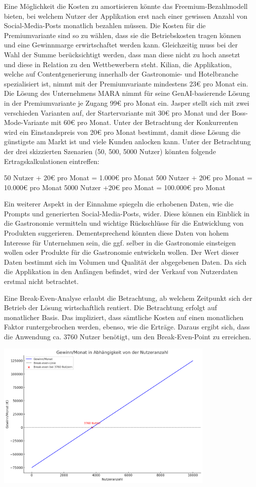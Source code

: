 Eine Möglichkeit die Kosten zu amortisieren könnte das Freemium-Bezahlmodell bieten, bei welchem Nutzer der Applikation erst nach einer gewissen Anzahl von Social-Media-Posts monatlich bezahlen müssen.
Die Kosten für die Premiumvariante sind so zu wählen, dass sie die Betriebskosten tragen können und eine Gewinnmarge erwirtschaftet werden kann.
Gleichzeitig muss bei der Wahl der Summe berücksichtigt werden, dass man diese nicht zu hoch ansetzt und diese in Relation zu den Wettbewerbern steht.
Kilian, die Applikation, welche auf Contentgenerierung innerhalb der Gastronomie- und Hotelbranche spezialisiert ist, nimmt mit der Premiumvariante mindestens 23€ pro Monat ein.
Die Lösung des Unternehmens MARA nimmt für seine GenAI-basierende Lösung in der Premiumvariante je Zugang 99€ pro Monat ein.
Jasper stellt sich mit zwei verschieden Varianten auf, der Startervariante mit 30€ pro Monat und der Boss-Mode-Variante mit 60€ pro Monat.
Unter der Betrachtung der Konkurrenten wird ein Einstandspreis von 20€ pro Monat bestimmt, damit diese Lösung die günstigste am Markt ist und viele Kunden anlocken kann.
Unter der Betrachtung der drei skizzierten Szenarien (50, 500, 5000 Nutzer) könnten folgende Ertragskalkulationen eintreffen:

50 Nutzer + 20€ pro Monat = 1.000€ pro Monat
500 Nutzer + 20€ pro Monat = 10.000€ pro Monat
5000 Nutzer +20€ pro Monat = 100.000€ pro Monat


Ein weiterer Aspekt in der Einnahme spiegeln die erhobenen Daten, wie die Prompts und generierten Social-Media-Posts, wider.
Diese können ein Einblick in die Gastronomie vermitteln und wichtige Rückschlüsse für die Entwicklung von Produkten suggerieren.
Dementsprechend könnten diese Daten von hohem Interesse für Unternehmen sein, die ggf. selber in die Gastronomie einsteigen wollen oder Produkte für die Gastronomie entwickeln wollen.
Der Wert dieser Daten bestimmt sich im Volumen und Qualität der abgegebenen Daten.
Da sich die Applikation in den Anfängen befindet, wird der Verkauf von Nutzerdaten erstmal nicht betrachtet.

Eine Break-Even-Analyse erlaubt die Betrachtung, ab welchem Zeitpunkt sich der Betrieb der Lösung wirtschaftlich rentiert.
Die Betrachtung erfolgt auf monatlicher Basis.
Das impliziert, dass sämtliche Kosten auf einen monatlichen Faktor runtergebrochen werden, ebenso, wie die Erträge.
Daraus ergibt sich, dass die Anwendung ca. 3760 Nutzer benötigt, um den Break-Even-Point zu erreichen.

\includegraphics[width=0.8\textwidth]{abbildungen/Break_Even}